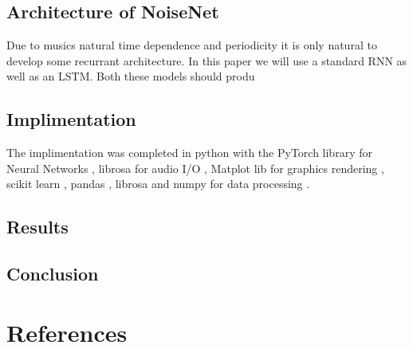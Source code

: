 \documentclass{article}
\begin{document}
\subsection{Architecture of NoiseNet}
\label{sec:arch}
Due to musics natural time dependence and periodicity it is only natural to develop some recurrant architecture. In this paper we will use a standard RNN as well as an LSTM. Both these models should produ
\subsection{Implimentation}
The implimentation was completed in python with the PyTorch library for Neural Networks \cite{NEURIPS2019_9015}, librosa for audio I/O \cite{mcfee2015librosa}, Matplot lib for graphics rendering \cite{Hunter:2007}, scikit learn \cite{scikit-learn}, pandas \cite{reback2020pandas} \cite{mckinney-proc-scipy-2010}, librosa \cite{mcfee2015librosa} and numpy \cite{harris2020array} for data processing \cite{fma_dataset}\cite{fma_challenge}.
\label{sec:impl}
\subsection{Results}
\label{sec:results}
\subsection{Conclusion}
\label{sec:conclusion}

\section{References}
\printbibliography[heading=bibintoc]
\end{document}
